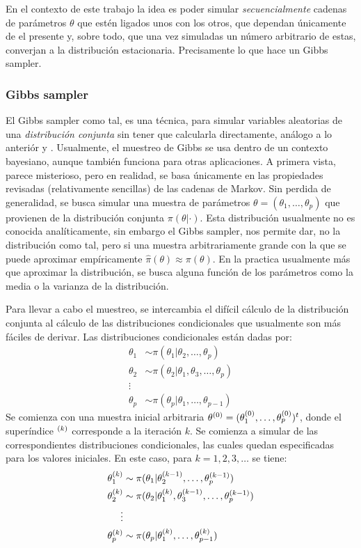 \documentclass[../Main/Main.tex]{subfiles}
\begin{document}
En el contexto de este trabajo la idea es poder simular \textit{secuencialmente} cadenas de parámetros $\theta$ que estén ligados unos con los otros, que dependan únicamente de el presente y,  sobre todo, que una vez simuladas un número arbitrario de estas, converjan a la distribución estacionaria. Precisamente lo que hace un Gibbs sampler.

\subsubsection{Gibbs sampler}
El Gibbs sampler como tal, es una técnica, para simular variables aleatorias de una \textit{distribución conjunta} sin tener que calcularla directamente, análogo a lo anteriór\autocite{gelfand1990sampling} y \autocite{casella1992explaining}. Usualmente, el muestreo de Gibbs se usa dentro de un contexto bayesiano, aunque también funciona para otras aplicaciones. A primera vista, parece misterioso, pero en realidad, se basa únicamente en las propiedades revisadas (relativamente sencillas) de las cadenas de Markov. Sin perdida de generalidad, se busca simular una muestra de parámetros $\theta = (\theta_1,\ldots,\theta_p)$ que provienen de la distribución conjunta $\pi(\theta|\cdot)$. Esta distribución usualmente no es conocida analíticamente, sin embargo el Gibbs sampler, nos permite dar, no la distribución como tal, pero si una muestra arbitrariamente grande con la que se puede aproximar empíricamente $\hat{\pi}(\theta) \approx \pi(\theta)$. En la practica usualmente más que aproximar la distribución, se busca alguna función de los parámetros como la media o la varianza de la distribución.

Para llevar a cabo el muestreo, se intercambia el difícil cálculo de la distribución conjunta al cálculo de las distribuciones condicionales que usualmente son más fáciles de derivar. Las distribuciones condicionales están dadas por: 
\begin{align}
	\theta_1 &\sim \pi(\theta_1|\theta_2,\ldots,\theta_p) \label{ec:DistCondicionales}\\
	\theta_2 &\sim \pi(\theta_2|\theta_1,\theta_3,\ldots,\theta_p)\nonumber \\ 
	\vdots \nonumber\\
	\theta_p &\sim \pi(\theta_p|\theta_1,\ldots,\theta_{p-1}) \nonumber
\end{align}
Se comienza con una muestra inicial arbitraria $\theta^{(0)} = (\theta_1^{(0)},\ldots,\theta_p^{(0)})^t$, donde el superíndice $^{(k)}$ corresponde a la iteración $k$. Se comienza a simular de las correspondientes distribuciones condicionales, las cuales quedan especificadas para los valores iniciales. En este caso, para $k = 1,2,3,\ldots$ se tiene:
\begin{align}
	\theta_1^{(k)} &\sim \pi(\theta_1|\theta_2^{(k-1)},\ldots,\theta_p^{(k-1)}) \label{ec:GibbsSampler}\\
	\theta_2^{(k)} &\sim \pi(\theta_2|\theta_1^{(k)},\theta_3^{(k-1)},\ldots,\theta_p^{(k-1)})\nonumber \\ 
	\vdots \nonumber\\
	\theta_p^{(k)} &\sim \pi(\theta_p|\theta_1^{(k)},\ldots,\theta_{p-1}^{(k)}) \nonumber
\end{align}
\end{document}
